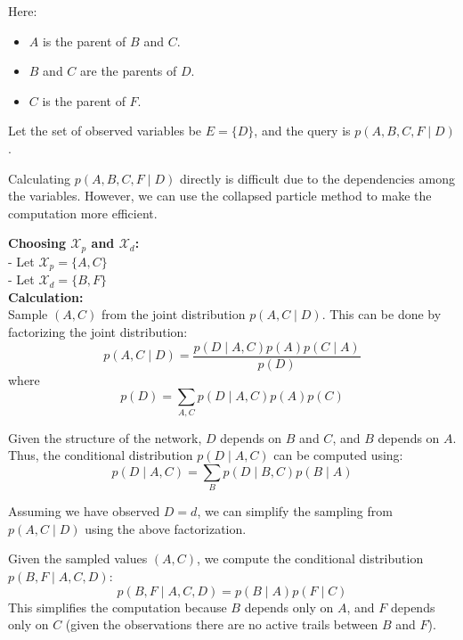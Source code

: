 \documentclass[a4 paper]{article}
\begin{document}
\begin{enumerate}
\begin{center}
\end{center}

Here:
\begin{itemize}
    \item \( A \) is the parent of \( B \) and \( C \).
    \item \( B \) and \( C \) are the parents of \( D \).
    \item \( C \) is the parent of \( F \).
\end{itemize}

Let the set of observed variables be \( E = \{D\} \), and the query is \( p(A, B, C, F \mid D) \).

Calculating \( p(A, B, C, F \mid D) \) directly is difficult due to the dependencies among the variables. However, we can use the collapsed particle method to make the computation more efficient.

\textbf{Choosing \( \mathcal{X}_p \) and \( \mathcal{X}_d \):} \\
- Let \( \mathcal{X}_p = \{A, C\} \) \\ 
- Let \( \mathcal{X}_d = \{B, F\} \) \\


\textbf{Calculation:} \\
    Sample \( (A, C) \) from the joint distribution \( p(A, C \mid D) \). This can be done by factorizing the joint distribution:
    \[
    p(A, C \mid D) = \frac{p(D \mid A, C) p(A) p(C \mid A)}{p(D)}
    \]
    where
    \[
    p(D) = \sum_{A, C} p(D \mid A, C) p(A) p(C)
    \]

    Given the structure of the network, \( D \) depends on \( B \) and \( C \), and \( B \) depends on \( A \). Thus, the conditional distribution \( p(D \mid A, C) \) can be computed using:
    \[
    p(D \mid A, C) = \sum_{B} p(D \mid B, C) p(B \mid A)
    \]

    Assuming we have observed \( D = d \), we can simplify the sampling from \( p(A, C \mid D) \) using the above factorization.

    Given the sampled values \( (A, C) \), we compute the conditional distribution \( p(B, F \mid A, C, D) \):
    \[
    p(B, F \mid A, C, D) = p(B \mid A) p(F \mid C)
    \]
    This simplifies the computation because \( B \) depends only on \( A \), and \( F \) depends only on \( C \) (given the observations there are no active trails between \( B \) and \( F \)).


\end{enumerate}
\end{document}
